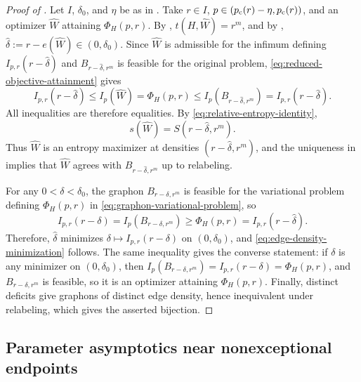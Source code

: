 \begin{proof}[Proof of ]
Let $I$, $\delta_0$, and $\eta$ be as in .
Take
$r\in I$, $p\in(p_{\mathrm c}(r)-\eta,p_{\mathrm c}(r))$, and an optimizer $\widehat W$ attaining
$\Phi_H(p,r)$.  By , $t(H,\widehat W)=r^m$, and by
,
$\widehat\delta:=r-e(\widehat W)\in(0,\delta_0)$.
Since $\widehat W$ is admissible for the infimum defining $I_{p,r}(r-\widehat\delta)$
and $B_{r-\widehat\delta,r^m}$ is feasible for the original problem,
\eqref{eq:reduced-objective-attainment} gives
\[
  I_{p,r}(r-\widehat\delta)\le I_p(\widehat W)=\Phi_H(p,r)
  \le I_p(B_{r-\widehat\delta,r^m})=I_{p,r}(r-\widehat\delta).
\]
All inequalities are therefore equalities.  By
\eqref{eq:relative-entropy-identity},
\[
  s(\widehat W)=S(r-\widehat\delta,r^m).
\]
Thus $\widehat W$ is an entropy maximizer at densities $(r-\widehat\delta,r^m)$,
and the uniqueness in  implies that
$\widehat W$ agrees with $B_{r-\widehat\delta,r^m}$ up to relabeling.

For any $0<\delta<\delta_0$, the graphon $B_{r-\delta,r^m}$ is feasible for the
variational problem defining $\Phi_H(p,r)$ in \eqref{eq:graphon-variational-problem}, so
\[
  I_{p,r}(r-\delta)=I_p(B_{r-\delta,r^m})\ge\Phi_H(p,r)
  =I_{p,r}(r-\widehat\delta).
\]
Therefore, $\widehat\delta$ minimizes $\delta\mapsto I_{p,r}(r-\delta)$ on
$(0,\delta_0)$, and
\eqref{eq:edge-density-minimization} follows.  The same inequality gives the converse
statement: if $\delta$ is any minimizer on $(0,\delta_0)$, then
$I_p(B_{r-\delta,r^m})=I_{p,r}(r-\delta)=\Phi_H(p,r)$,
and $B_{r-\delta,r^m}$ is feasible, so it is an optimizer
attaining $\Phi_H(p,r)$.
Finally, distinct deficits give graphons of distinct edge density, hence
inequivalent under relabeling, which gives the asserted bijection.
\end{proof}

\subsection{Parameter asymptotics near nonexceptional endpoints}
\label{app:bipodal-parameter-expansions}

